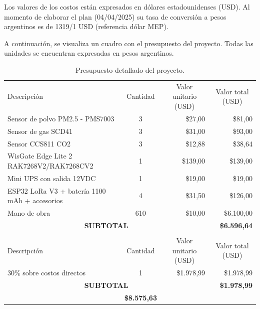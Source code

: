 \documentclass[
11pt, %
]{charter}
\begin{document}
Los valores de los costos están expresados en dólares estadounidenses (USD). Al momento de elaborar el plan (04/04/2025) su tasa de conversión a pesos argentinos es de 1319/1 USD (referencia dólar MEP).

A continuación, se visualiza un cuadro con el presupuesto del proyecto. Todas las unidades se encuentran expresadas en pesos argentinos.
\begin{table}[htpb]
\centering
\begin{tabularx}{\linewidth}{@{}|X|c|r|r|@{}}
\hline
\rowcolor[HTML]{C0C0C0} 
\multicolumn{4}{|c|}{\cellcolor[HTML]{C0C0C0}COSTOS DIRECTOS} \\ \hline
\rowcolor[HTML]{C0C0C0} 
Descripción &
  \multicolumn{1}{c|}{Cantidad} &
  \multicolumn{1}{c|}{Valor unitario (USD)} &
  \multicolumn{1}{c|}{Valor total (USD)} \\ \hline
Sensor de polvo PM2.5 - PMS7003 & 3 & \$27,00 & \$81,00 \\ \hline
Sensor de gas SCD41 & 3 & \$31,00 & \$93,00 \\ \hline
Sensor CCS811 CO2 & 3 & \$12,88 & \$38,64 \\ \hline
WisGate Edge Lite 2 RAK7268V2/RAK7268CV2 & 1 & \$139,00 & \$139,00 \\ \hline
Mini UPS con salida 12VDC & 1 & \$19,00 & \$19,00 \\ \hline
ESP32 LoRa V3 + batería 1100 mAh + accesorios & 4 & \$31,50 & \$126,00 \\ \hline
Mano de obra & 610 & \$10,00 & \$6.100,00 \\ \hline
\multicolumn{3}{|c|}{\textbf{SUBTOTAL}} & \textbf{\$6.596,64} \\ \hline

\rowcolor[HTML]{C0C0C0} 
\multicolumn{4}{|c|}{\cellcolor[HTML]{C0C0C0}COSTOS INDIRECTOS} \\ \hline
\rowcolor[HTML]{C0C0C0} 
Descripción &
  \multicolumn{1}{c|}{Cantidad} &
  \multicolumn{1}{c|}{Valor unitario (USD)} &
  \multicolumn{1}{c|}{Valor total (USD)} \\ \hline
30\% sobre costos directos & 1 & \$1.978,99 & \$1.978,99 \\ \hline
\multicolumn{3}{|c|}{\textbf{SUBTOTAL}} & \textbf{\$1.978,99} \\ \hline
\rowcolor[HTML]{C0C0C0}
\multicolumn{3}{|c|}{\textbf{TOTAL}} & \textbf{\$8.575,63} \\ \hline
\end{tabularx}
\caption{Presupuesto detallado del proyecto.}
\label{tab:presupuesto}
\end{table}
\end{document}

